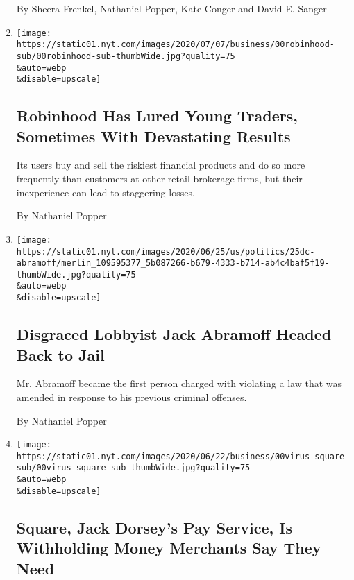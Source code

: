 \begin{enumerate}
  By Sheera Frenkel, Nathaniel Popper, Kate Conger and David E. Sanger
\item
  \href{/2020/07/08/technology/robinhood-risky-trading.html}{}

  \texttt{[image: https://static01.nyt.com/images/2020/07/07/business/00robinhood-sub/00robinhood-sub-thumbWide.jpg?quality=75\\\&auto=webp\\\&disable=upscale]}

  \hypertarget{robinhood-has-lured-young-traders-sometimes-with-devastating-results}{%
  \subsection{Robinhood Has Lured Young Traders, Sometimes With
  Devastating
  Results}\label{robinhood-has-lured-young-traders-sometimes-with-devastating-results}}

  Its users buy and sell the riskiest financial products and do so more
  frequently than customers at other retail brokerage firms, but their
  inexperience can lead to staggering losses.

  By Nathaniel Popper
\item
  \href{/2020/06/25/us/politics/jack-abramoff-marijuana-cryptocurrency.html}{}

  \texttt{[image: https://static01.nyt.com/images/2020/06/25/us/politics/25dc-abramoff/merlin\_109595377\_5b087266-b679-4333-b714-ab4c4baf5f19-thumbWide.jpg?quality=75\\\&auto=webp\\\&disable=upscale]}

  \hypertarget{disgraced-lobbyist-jack-abramoff-headed-back-to-jail}{%
  \subsection{Disgraced Lobbyist Jack Abramoff Headed Back to
  Jail}\label{disgraced-lobbyist-jack-abramoff-headed-back-to-jail}}

  Mr. Abramoff became the first person charged with violating a law that
  was amended in response to his previous criminal offenses.

  By Nathaniel Popper
\item
  \href{/2020/06/23/technology/square-jack-dorsey-pandemic-withholding.html}{}

  \texttt{[image: https://static01.nyt.com/images/2020/06/22/business/00virus-square-sub/00virus-square-sub-thumbWide.jpg?quality=75\\\&auto=webp\\\&disable=upscale]}

  \hypertarget{square-jack-dorseys-pay-service-is-withholding-money-merchants-say-they-need}{%
  \subsection{Square, Jack Dorsey's Pay Service, Is Withholding Money
  Merchants Say They
  Need}\label{square-jack-dorseys-pay-service-is-withholding-money-merchants-say-they-need}}


\end{enumerate}

